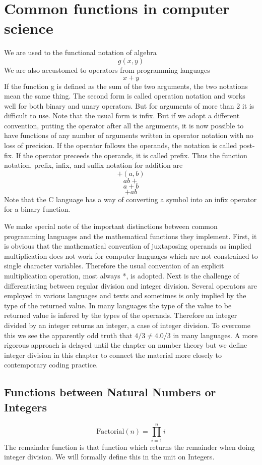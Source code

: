\section {Common functions in computer science}

We are used to the functional notation of algebra
$$  g(x,y)$$
We are also accustomed to operators from programming languages
$$x+y$$
If the function g is defined as the sum of the two arguments, the two notations mean the same thing. The second form is called operation notation and works well for both binary and unary operators. But for arguments of more than 2 it is difficult to use. Note that the usual form is infix. But if we adopt a different convention, putting the operator after all the arguments, it is now possible to have functions of any number of arguments written in operator notation with no loss of precision. If the operator follows the operands, the notation is called post-fix. If the operator preceeds the operands, it is called prefix. Thus the function notation, prefix, infix, and suffix notation for addition are
$$+(a,b)$$
$$ab+$$
$$a+b$$
$$+ab$$
Note that the C language has a way of converting a symbol into an infix operator for a binary function.

We make special note of the important distinctions between common programming languages and the mathematical functions they implement. First, it is obvious that the mathematical convention of juxtaposing operands as implied multiplication does not work for computer languages which are not constrained to single character variables. Therefore the usual convention of an explicit multiplication operation, most always *, is adopted. Next is the challenge of differentiating between regular division and integer division. Several operators are employed in various languages and texts and sometimes is only implied by the type of the returned value. In many languages the type of the value to be returned value is infered by the types of the operands. Therefore an integer divided by an integer returns an integer, a case of integer division. To overcome this we see the apparently odd truth that $4/3 \ne 4.0/3$ in many languages. A more rigorous approach is delayed until the chapter on number theory but we define integer division in this chapter to connect the material more closely to contemporary coding practice.

	\subsection{Functions between Natural Numbers or Integers}
	\begin{displaymath}
	\text{Factorial}(n) = \prod_{i=1}^n i
	\end{displaymath}
	The remainder function is that function which returns the remainder when doing integer division. We will formally define this in the unit on Integers.
	
